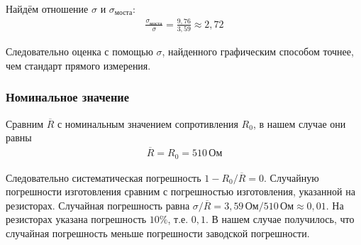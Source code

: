 Найдём отношение $\sigma$ и $\sigma_{\text{моста}}$:
\begin{align*}
	\frac{\sigma_{\text{моста}}}{\sigma} = \frac{9,76}{3,59} \approx 2,72
\end{align*}

Следовательно оценка с помощью $\sigma$, найденного графическим способом точнее, чем стандарт прямого измерения.

\subsubsection{Номинальное значение}

Сравним $\overline{R}$ с номинальным значением сопротивления $R_0$, в нашем случае они равны
\begin{align*}
	\overline{R} = R_0 = 510 \, \text{Ом}
\end{align*}

Следовательно систематическая погрешность $1 - R_0 / \overline{R} = 0$.
Случайную погрешности изготовления сравним с погрешностью изготовления, указанной на резисторах.
Случайная погрешность равна $\sigma / \overline{R} = 3,59 \, \text{Ом} / 510 \, \text{Ом} \approx 0,01$. На резисторах указана погрешность $10\%$, т.е. $0,1$. В нашем случае получилось, что случайная погрешность меньше погрешности заводской погрешности.
